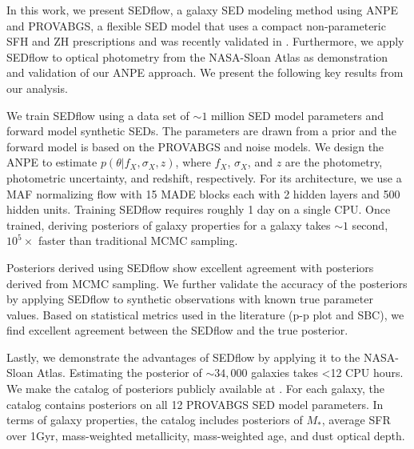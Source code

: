 In this work, we present {\sc SEDflow}, a galaxy SED modeling method using ANPE
and PROVABGS, a flexible SED model that uses a compact non-parameteric SFH and
ZH prescriptions and was recently validated in \cite{hahn2022}.
Furthermore, we apply {\sc SEDflow} to optical photometry from the NASA-Sloan
Atlas as demonstration and validation of our ANPE approach.  
We present the following key results from our analysis.
\begin{compactitem}
    \item We train {\sc SEDflow} using a data set of ${\sim}1$ million SED
        model parameters and forward model synthetic SEDs.
        The parameters are drawn from a prior and the forward model is based on
        the PROVABGS and noise models. 
        We design the ANPE to estimate $p(\theta | f_X, \sigma_X, z)$, where
        $f_X$, $\sigma_X$, and $z$ are the photometry, photometric uncertainty,
        and redshift, respectively. 
        For its architecture, we use a MAF normalizing flow with 15 MADE blocks
        each with 2 hidden layers and 500 hidden units.
        Training {\sc SEDflow} requires roughly 1 day on a single CPU. 
        Once trained, deriving posteriors of galaxy properties for a galaxy
        takes ${\sim}1$ second, $10^5\times$ faster than traditional MCMC sampling. 
    \item Posteriors derived using {\sc SEDflow} show excellent agreement with
        posteriors derived from MCMC sampling. 
        We further validate the accuracy of the posteriors by applying  {\sc
        SEDflow} to synthetic observations with known true parameter values.  
        Based on statistical metrics used in the literature (p-p plot and SBC),
        we find excellent agreement between the {\sc SEDflow} and the true
        posterior. 
    \item Lastly, we demonstrate the advantages of {\sc SEDflow} by applying it
        to the NASA-Sloan Atlas.
        Estimating the posterior of ${\sim}34,000$ galaxies takes <12 CPU hours. 
        We make the catalog of posteriors publicly available at . 
        For each galaxy, the catalog contains posteriors on all 12 PROVABGS
        SED model parameters.
        In terms of galaxy properties, the catalog includes posteriors of
        $M_*$, average SFR over 1Gyr, mass-weighted metallicity, mass-weighted
        age, and dust optical depth. 
\end{compactitem}

